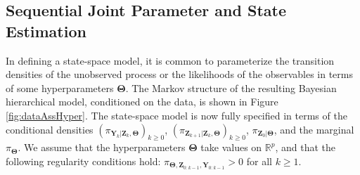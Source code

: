 \documentclass[twoside,11pt]{article}
\newcommand{\re}{\mathbb{R}}
\newcommand{\Yb}{\boldsymbol{Y}}
\newcommand{\Zb}{\boldsymbol{Z}}
\newcommand{\vhyp}{\boldsymbol{\Theta}}
\newcommand{\dhyp}{p}
\begin{document}
%
%
%
%
%
%
%
%
%
%
%
%
%
%
%
%
%
%
%
%
%
%
%
%
%
%
%
%
%

%
%
%
%

%
%
%
%
%
%
%
%
%
%
%
%
%
%
%
%
%
%
%
%
%
%
%
%
%
%
%
%
%
%
%
%
%
%
%
%
%
%
%
%
%
%








%
%
%


\subsection{Sequential Joint Parameter and State Estimation} %
\label{sec:joint}
%
In defining a state-space model, it is common to parameterize the
transition densities of the unobserved process or the likelihoods of
the observables in terms of some hyperparameters $\vhyp$. The Markov
structure of the resulting Bayesian hierarchical model, conditioned on
the data, is shown in Figure \ref{fig:dataAssHyper}.
%
%
The state-space model is
now fully specified in terms of the conditional densities
$(\pi_{\Yb_{k}\vert\Zb_k, \vhyp})_{k\geq 0}$,
$(\pi_{\Zb_{k+1}\vert\Zb_k, \vhyp})_{k\geq 0}$,
$\pi_{\Zb_0 \vert \vhyp}$, and the marginal $\pi_{\vhyp}$. We assume
that the hyperparameters $\vhyp$ take values on $\re^{\dhyp}$, and that
the following regularity conditions hold:
%
%
$\pi_{\vhyp,\Zb_{0:k-1}, \Yb_{0:k-1}} > 0$
for all $k\ge 1$.
\end{document}
